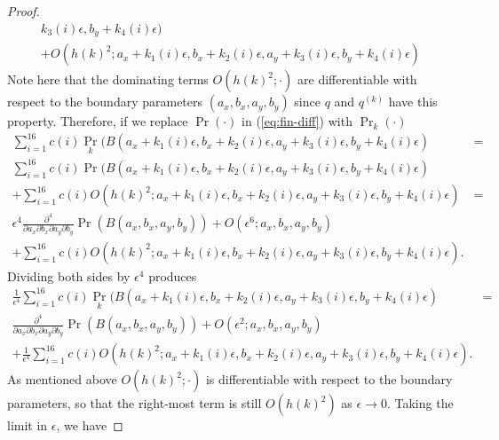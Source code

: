 \begin{proof}
\begin{multline*}
    k_3(i)\epsilon, b_y + k_4(i)\epsilon) \\
    + O(h(k)^2; a_x + k_1(i)\epsilon, b_x + k_2(i)\epsilon, a_y + k_3(i)\epsilon, b_y + k_4(i)\epsilon) 
  \end{multline*}
  Note here that the dominating terms $O(h(k)^2; \cdot)$ are
  differentiable with respect to the boundary parameters
  $(a_x, b_x, a_y, b_y)$ since $q$ and $q^{(k)}$ have this
  property. Therefore, if we replace $\Pr(\cdot)$ in
  (\ref{eq:fin-diff}) with $\Pr_k(\cdot)$
  \begin{align*}
    \sum_{i=1}^{16} c(i) \Pr_k(B(a_x + k_1(i)\epsilon, b_x +
    k_2(i)\epsilon, a_y + k_3(i)\epsilon, b_y + k_4(i)\epsilon) &= \\
    \sum_{i=1}^{16} c(i) \Pr(B(a_x + k_1(i)\epsilon, b_x +
    k_2(i)\epsilon, a_y + k_3(i)\epsilon, b_y + k_4(i)\epsilon) &  \\
    + \sum_{i=1}^{16} c(i) O(h(k)^2; a_x + k_1(i)\epsilon, b_x +
    k_2(i)\epsilon, a_y + k_3(i)\epsilon, b_y + k_4(i)\epsilon) &= \\
    \epsilon^4 \frac{\partial^4}{\partial a_x \partial b_x \partial
    a_y \partial b_y} \Pr(B(a_x, b_x, a_y, b_y)) + O(\epsilon^6 ;
    a_x, b_x, a_y, b_y) & \\
    + \sum_{i=1}^{16} c(i) O(h(k)^2; a_x + k_1(i)\epsilon, b_x +
    k_2(i)\epsilon, a_y + k_3(i)\epsilon, b_y + k_4(i)\epsilon). &
  \end{align*}
  Dividing both sides by $\epsilon^4$ produces
  \begin{align*}
    \frac{1}{\epsilon^4} \sum_{i=1}^{16} c(i) \Pr_k(B(a_x + k_1(i)\epsilon, b_x +
    k_2(i)\epsilon, a_y + k_3(i)\epsilon, b_y + k_4(i)\epsilon) &= \\
    \frac{\partial^4}{\partial a_x \partial b_x \partial
    a_y \partial b_y} \Pr(B(a_x, b_x, a_y, b_y)) + O(\epsilon^2;
    a_x, b_x, a_y, b_y) \\
    + \frac{1}{\epsilon^4}\sum_{i=1}^{16} c(i) O(h(k)^2; a_x + k_1(i)\epsilon, b_x +
    k_2(i)\epsilon, a_y + k_3(i)\epsilon, b_y + k_4(i)\epsilon).
  \end{align*}
  As mentioned above $O(h(k)^2; \cdot)$ is differentiable with respect
  to the boundary parameters, so that the right-most term is still
  $O(h(k)^2)$ as $\epsilon \to 0$. Taking the limit in $\epsilon$, we have

\end{proof}
